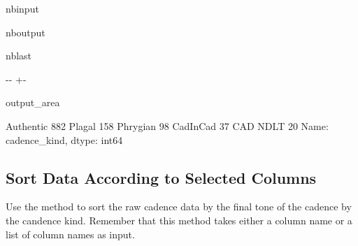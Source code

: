 \documentclass[letterpaper,10pt,english]{sphinxmanual}
\newlength\nbsphinxcodecellspacing
\begin{document}
\begin{sphinxuseclass}{nbinput}
{
\begin{sphinxVerbatim}[commandchars=\\\{\}]
\llap{\color{nbsphinxin}[22]:\,\hspace{\fboxrule}\hspace{\fboxsep}}\PYG{p}{[}\PYG{p}{]}
\end{sphinxVerbatim}
}

\end{sphinxuseclass}
\begin{sphinxuseclass}{nboutput}
\begin{sphinxuseclass}{nblast}
{

\kern-\sphinxverbatimsmallskipamount\kern-\baselineskip
\kern+\FrameHeightAdjust\kern-\fboxrule
\vspace{\nbsphinxcodecellspacing}

\begin{sphinxuseclass}{output_area}
\begin{sphinxuseclass}{}


\begin{sphinxVerbatim}[commandchars=\\\{\}]
\llap{\color{nbsphinxout}[22]:\,\hspace{\fboxrule}\hspace{\fboxsep}}Authentic    882
Plagal       158
Phrygian      98
CadInCad      37
CAD NDLT      20
Name: cadence\_kind, dtype: int64
\end{sphinxVerbatim}



\end{sphinxuseclass}
\end{sphinxuseclass}
}

\end{sphinxuseclass}
\end{sphinxuseclass}

\subsection{Sort Data According to Selected Columns}
\label{\detokenize{exercises/02_exercise:Sort-Data-According-to-Selected-Columns}}
\sphinxAtStartPar
Use the  method to sort the raw cadence data by the final tone of the cadence  by the candence kind. Remember that this method takes either a column name or a list of column names as input.
\end{document}
